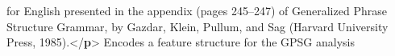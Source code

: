 \begin{shaded}
\hspace*{1em}\hspace*{1em}\hspace*{1em}\hspace*{1em}\hspace*{1em}\hspace*{1em}\hspace*{1em}\hspace*{1em} for English presented in the appendix (pages 245–247) of\mbox{}\newline 
\hspace*{1em}\hspace*{1em}\hspace*{1em}\hspace*{1em}\hspace*{1em}\hspace*{1em}\hspace*{1em}\hspace*{1em} Generalized Phrase Structure Grammar, by Gazdar, Klein,\mbox{}\newline 
\hspace*{1em}\hspace*{1em}\hspace*{1em}\hspace*{1em}\hspace*{1em}\hspace*{1em}\hspace*{1em}\hspace*{1em} Pullum, and Sag (Harvard University Press, 1985).{</\textbf{p}>}\mbox{}\newline 
\hspace*{1em}\hspace*{1em}\mbox{}\newline 
\hspace*{1em}\mbox{}\newline 
{}\mbox{}\newline 
{}\mbox{}\newline 
\hspace*{1em}\mbox{}\newline 
\hspace*{1em}\hspace*{1em}Encodes a feature structure for the GPSG analysis\mbox{}\newline 

\end{shaded}
